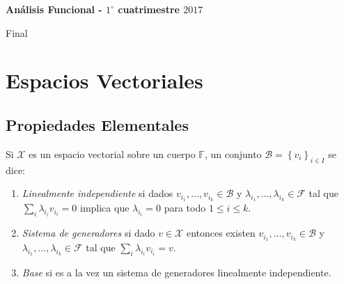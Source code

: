 \documentclass[11pt]{article}
\newcommand{\B}{\mathcal{B}}
\newcommand{\F}{\mathcal{F}}
\newcommand{\sett}[1]{\left\lbrace#1\right\rbrace}
\newcommand{\Bigsum}[2]{\sum\limits_{#1}{#2}}
\numberwithin{theorem}{subsection}
\newenvironment{definition}[1][Definici\'on]{\begin{trivlist}
		\item[\hskip \labelsep {\bfseries #1}]}{\end{trivlist}}
\begin{document}
	
	\pagestyle{empty}
	\pagestyle{fancy}
	\fancyfoot[CO]{\slshape \thepage}
	\renewcommand{\headrulewidth}{0pt}
	
	
	
	\centerline{\bf An\'alisis Funcional - $1^{\circ}$ cuatrimestre $2017$}
	\centerline{\sc Final}
	
	\tableofcontents
	\bigskip

\section{Espacios Vectoriales}

\subsection{Propiedades Elementales}

\begin{definition}
Si $\mathcal{X}$ es un espacio vectorial sobre un cuerpo $\mathbb{F}$, un conjunto $\mathcal{B} = \sett{v_i}_{i \in I}$ se dice:

\begin{enumerate}
\item \textit{Linealmente independiente} si dados $v_{i_1}, \dots, v_{i_k} \in \B$ y $\lambda_{i_1},  \dots, \lambda_{i_k} \in \F$ tal que $\Bigsum{i}{\lambda_{i_i}v_{i_i}} = 0$ implica que $\lambda_{i_i} = 0$ para todo $1 \leq i \leq k$.
\item \textit{Sistema de generadores} si dado $v \in \mathcal{X}$ entonces existen $v_{i_1}, \dots, v_{i_k} \in \B$ y $\lambda_{i_1},  \dots, \lambda_{i_k} \in \F$ tal que $\Bigsum{i}{\lambda_{i_i}v_{i_i}} = v$.
\item \textit{Base} si es a la vez un sistema de generadores linealmente independiente.
\end{enumerate}
\end{definition}
\end{document}
